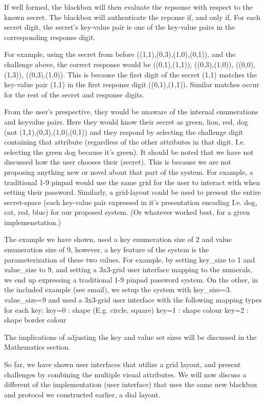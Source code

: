\documentclass[12pt]{document}
\begin{document}
\begin{Introduction}
If well formed, the blackbox will then evaluate the repsonse with respect to the known secret.
The blackbox will authenticate the reponse if, and only if,
  For each secret digit,
    the secret's key-value pair is one of the key-value pairs in the corresponding response digit.

For example, using the secret from before ((1,1),(0,3),(1,0),(0,1)), and the challenge above, the correct response would be ((0,1),(1,1)), ((0,3),(1,0)), ((0,0),(1,3)), ((0,3),(1,0)).
This is because the first digit of the secret (1,1) matches the key-value pair (1,1) in the first response digit ((0,1),(1,1)). Similar matches occur for the rest of the secret and response digits.

From the user's prespective, they would be unaware of the internal enumerations and keyvalue pairs.
Here they would know their secret as green, lion, red, dog (not (1,1),(0,3),(1,0),(0,1)) and they respond by selecting the challenge digit containing that attribute (regardless of the other attributes in that digit. I.e. selecting the green dog because it's green). It should be noted that we have not discussed how the user chooses their (secret). This is because we are not proposing anything new or novel about that part of the system. For example, a traditional 1-9 pinpad would use the same grid for the user to interact with when setting their password. Similarly, a grid-layout could be used to present the entire secret-space (each key-value pair expressed in it's presentation encoding I.e. dog, cat, red, blue) for our proposed system. (Or whatever worked best, for a given implemenetation.)

The example we have shown, used a key enumeration size of 2 and value enumeration size of 9, however, a key feature of the system is the parameterization of these two values. For example, by setting key_size to 1 and value_size to 9, and setting a 3x3-grid user interface mapping to the numerals, we end up expressing a traditional 1-9 pinpad password system. On the other, in the included example (see email), we setup the system with key_size=3. value_size=9 and used a 3x3-grid user interface with the following mapping types for each key:
  key=0 : shape (E.g. circle, square)
  key=1 : shape colour
  key=2 : shape border colour

The implications of adjusting the key and value set sizes will be discussed in the Mathematics section.



So far, we have shown user interfaces that utilize a grid layout, and present challenges by combining the multiple visual attributes.
We will now discuss a different of the implementation (user interface) that uses the same new blackbox and protocol we constructed earlier, a dial layout.


\end{Introduction}
\end{document}
